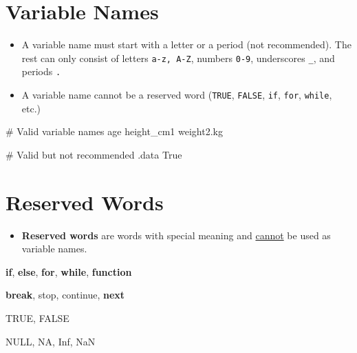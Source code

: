 \documentclass[
  letterpaper,
  DIV=11,
  numbers=noendperiod]{scrreprt}
\newenvironment{Shaded}{\begin{snugshade}}{\end{snugshade}}
\newcommand{\CommentTok}[1]{\textcolor[rgb]{0.37,0.37,0.37}{#1}}
\newcommand{\ConstantTok}[1]{\textcolor[rgb]{0.56,0.35,0.01}{#1}}
\newcommand{\ControlFlowTok}[1]{\textcolor[rgb]{0.00,0.23,0.31}{\textbf{#1}}}
\newcommand{\NormalTok}[1]{\textcolor[rgb]{0.00,0.23,0.31}{#1}}
\providecommand{\tightlist}{%
  \setlength{\itemsep}{0pt}\setlength{\parskip}{0pt}}\usepackage{longtable,booktabs,array}
\begin{document}
\section{Variable Names}\label{variable-names-1}

\begin{itemize}
\item
  A variable name must start with a letter or a period (not
  recommended). The rest can only consist of letters \texttt{a-z,\ A-Z},
  numbers \texttt{0-9}, underscores \texttt{\_}, and periods \texttt{.}
\item
  A variable name cannot be a reserved word (\texttt{TRUE},
  \texttt{FALSE}, \texttt{if}, \texttt{for}, \texttt{while}, etc.)
\end{itemize}

\begin{Shaded}
\begin{Highlighting}[]
\CommentTok{\# Valid variable names}
\NormalTok{age            }
\NormalTok{height\_cm1    }
\NormalTok{weight2.kg    }

\CommentTok{\# Valid but not recommended}
\NormalTok{.data       }
\NormalTok{True}
\end{Highlighting}
\end{Shaded}

\section{Reserved Words}\label{reserved-words}

\begin{itemize}
\tightlist
\item
  \textbf{Reserved words} are words with special meaning and \ul{cannot}
  be used as variable names.
\end{itemize}

\begin{Shaded}
\begin{Highlighting}[]
\ControlFlowTok{if}\NormalTok{, }\ControlFlowTok{else}\NormalTok{, }\ControlFlowTok{for}\NormalTok{, }\ControlFlowTok{while}\NormalTok{, }\ControlFlowTok{function} 

\ControlFlowTok{break}\NormalTok{, stop, continue, }\ControlFlowTok{next}

\ConstantTok{TRUE}\NormalTok{, }\ConstantTok{FALSE}

\ConstantTok{NULL}\NormalTok{, }\ConstantTok{NA}\NormalTok{, }\ConstantTok{Inf}\NormalTok{, }\ConstantTok{NaN}
\end{Highlighting}
\end{Shaded}
\end{document}
